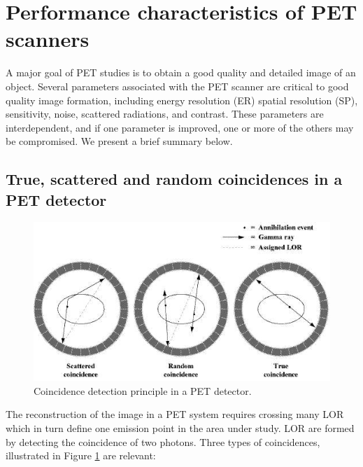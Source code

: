 \section{Performance characteristics of PET scanners}
\label{sec.ppet}

A major goal of PET studies is to obtain a good quality and detailed image of an object. Several parameters associated with the PET scanner are critical to good quality image formation, including energy resolution (ER) spatial resolution (SP), sensitivity, noise, scattered radiations, and contrast. These parameters are interdependent, and if one parameter is improved, one or more of the others may be compromised. We present a brief summary below.

\subsection{True, scattered and random coincidences in a PET detector}

\begin{figure}[!bthp]
	\centering
	\includegraphics[scale=1.0]{img/MAPD_coincidencecategories.jpg}
	\caption{\label{fig.coi} Coincidence detection principle in a PET detector.}
\end{figure}


The reconstruction of the image in a PET system requires crossing many LOR which in turn define one emission point in the area under study. LOR are formed by detecting the coincidence of two photons. Three types of coincidences, illustrated in Figure \ref{fig.coi} are relevant:

